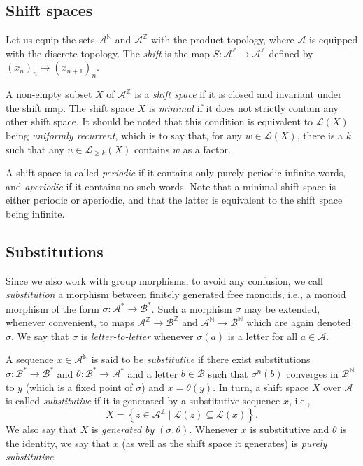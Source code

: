\documentclass{amsart}
\newcommand*{\nn}{\mathbb{N}}
\newcommand*{\zz}{\mathbb{Z}}
\newcommand*{\lang}{\mathcal{L}}
\newcommand*{\cA}{\mathcal{A}}
\newcommand*{\cB}{\mathcal{B}}
\newcommand*{\from}{\colon}
\theoremstyle{plain}
\theoremstyle{definition}
\theoremstyle{remark}
\begin{document}
\subsection{Shift spaces}

Let us equip the sets $\cA^\nn$ and $\cA^\zz$ with the product topology, where $\cA$ is equipped with the discrete topology. The \emph{shift} is the map $S \from \cA^\zz \to \cA^\zz$ defined by $(x_n)_n \mapsto (x_{n+1})_n$. 

A non-empty subset $X$ of $\cA^\zz$ is a \emph{shift space} if it is closed and invariant under the shift map. The shift space $X$ is \emph{minimal} if it does not strictly contain any other shift space. It should be noted that this condition is equivalent to $\lang(X)$ being \emph{uniformly recurrent}, which is to say that, for any $w \in \lang(X)$, there is a $k$ such that any $u \in \lang_{\ge k}(X)$ contains $w$ as a factor. 

A shift space is called \emph{periodic} if it contains only purely periodic infinite words, and \emph{aperiodic} if it contains no such words. Note that a minimal shift space is either periodic or aperiodic, and that the latter is equivalent to the shift space being infinite.

\subsection{Substitutions}

Since we also work with group morphisms, to avoid any confusion, we call \emph{substitution} a morphism between finitely generated free monoids, i.e., a monoid morphism of the form $\sigma\from \cA^* \to \cB^*$. Such a morphism $\sigma$ may be extended, whenever convenient, to maps $\cA^\zz\to \cB^\zz$ and $\cA^\nn\to\cB^\nn$ which are again denoted $\sigma$. We say that $\sigma$ is \emph{letter-to-letter} whenever $\sigma(a)$ is a letter for all $a \in \cA$.

A sequence $x \in \cA^\nn$ is said to be {\em substitutive} if there exist substitutions $\sigma\from\cB^* \to \cB^*$ and $\theta\from \cB^* \to \cA^*$ and a letter $b \in \cB$ such that $\sigma^n(b)$ converges in $\cB^\nn$ to $y$ (which is a fixed point of $\sigma$) and $x = \theta(y)$.
In turn, a shift space $X$ over $\cA$ is called \emph{substitutive} if it is generated by a substitutive sequence $x$, i.e.,
\[
    X = \left\{z \in \cA^\zz \mid \lang(z) \subseteq \lang(x) \right\}. 
\]
We also say that $X$ is \emph{generated by} $(\sigma,\theta)$.
Whenever $x$ is substitutive and $\theta$ is the identity, we say that $x$ (as well as the shift space it generates) is {\em purely substitutive}.
\end{document}
